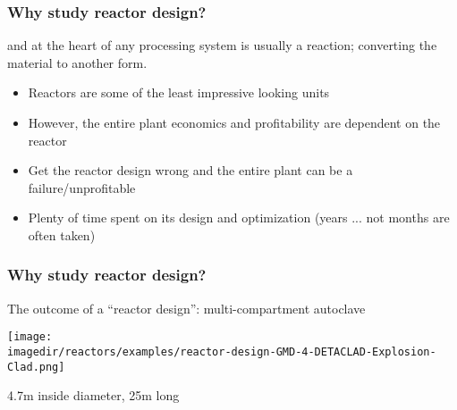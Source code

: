 \begin{frame}\frametitle{Why study reactor design?}
	\begin{exampleblock}{}
		\begin{center}
			{\color{myGreen}{Chemical Engineering is about ``processing'' material}}
		\end{center}
	\end{exampleblock}
	and at the heart of any processing system is usually a reaction; converting the material to another form.
	
	\vspace{12pt}
	\begin{itemize}
		\item	Reactors are some of the least impressive looking units
		\item	However, the entire plant economics and profitability are dependent on the reactor
		\item	Get the reactor design wrong and the entire plant can be a failure/unprofitable
		\item	Plenty of time spent on its design and optimization (years ... not months are often taken)
	\end{itemize}	
\end{frame}

\begin{frame}\frametitle{Why study reactor design?}
	The outcome of a ``reactor design'': multi-compartment autoclave
	\begin{center}
		\texttt{[image: \\imagedir/reactors/examples/reactor-design-GMD-4-DETACLAD-Explosion-Clad.png]}
		
		4.7m inside diameter, 25m long
	\end{center}
\end{frame}

